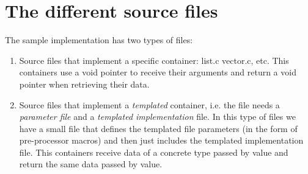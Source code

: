 \documentclass[12pt,a4paper,openany]{memoir} %
\begin{document}
{{\section{The different source files}

The sample implementation has two types of files:
\begin{enumerate}
\item Source files that implement a specific container: list.c vector.c, etc. This containers use a void pointer to receive their arguments and return
a void pointer when retrieving their data.
\item Source files that implement a \textsl{templated} container, i.e. the file needs a \textsl{parameter file} and a \textsl{templated implementation} 
file. In this type of files we have a small file that defines the templated file parameters (in the form of pre-processor macros) and then just 
includes the templated implementation file. This containers receive data of a concrete type passed by value and return the same data passed by value.
\end{enumerate}

}}
\end{document}
